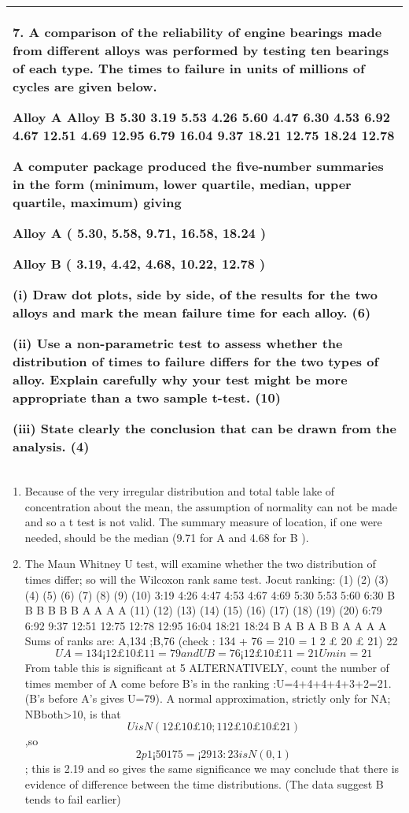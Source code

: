 \documentclass[a4paper,12pt]{article}
\begin{document}
\begin{table}[ht!]
 \centering
 \begin{tabular}{|p{15cm}|}
 \hline  
7. A comparison of the reliability of engine bearings made from different alloys was performed by testing ten bearings of each type.  The times to failure in units of millions of cycles are given below. 
 
Alloy A Alloy B   5.30   3.19   5.53   4.26   5.60   4.47   6.30   4.53   6.92   4.67 12.51   4.69 12.95   6.79 16.04   9.37 18.21 12.75 18.24 12.78 
 
A computer package produced the five-number summaries in the form (minimum, lower quartile, median, upper quartile, maximum) giving 
 
Alloy A   ( 5.30, 5.58, 9.71, 16.58, 18.24 ) 
 
Alloy B   ( 3.19, 4.42, 4.68, 10.22, 12.78 ) 
 
 
(i) Draw dot plots, side by side, of the results for the two alloys and mark the mean failure time for each alloy.  (6) 
 
(ii) Use a non-parametric test to assess whether the distribution of times to failure differs for the two types of alloy.  Explain carefully why your test might be more appropriate than a two sample t-test.  (10) 
 
(iii) State clearly the conclusion that can be drawn from the analysis. 
(4) \\ \hline
  \end{tabular}
\end{table}
\begin{enumerate}
\item 
Because of the very irregular distribution and total table lake of concentration
about the mean, the assumption of normality can not be made and so a t test is not
valid. The summary measure of location, if one were needed, should be the median
(9.71 for A and 4.68 for B ). 
\item The Maun Whitney U test, will examine whether the two
distribution of times differ; so will the Wilcoxon rank same test.
Jocut ranking:
(1) (2) (3) (4) (5) (6) (7) (8) (9) (10)
3:19 4:26 4:47 4:53 4:67 4:69 5:30 5:53 5:60 6:30
B B B B B B A A A A
(11) (12) (13) (14) (15) (16) (17) (18) (19) (20)
6:79 6:92 9:37 12:51 12:75 12:78 12:95 16:04 18:21 18:24
B A B A B B A A A A
Sums of ranks are: A,134 ;B,76 (check : 134 + 76 = 210 = 1
2 £ 20 £ 21)
22
\[UA = 134 ¡
1
2
£ 10 £ 11 = 79 and UB = 76 ¡
1
2
£ 10 £ 11 = 21 Umin = 21\]
From table this is significant at 5%
ALTERNATIVELY, count the number of times member of A come before B’s in the
ranking :U=4+4+4+4+3+2=21.(B’s before A’s gives U=79). A normal approximation,
strictly only for NA; NBboth>10, is that \[U is N( 1
2 £ 10 £ 10; 1
12 £ 10 £ 10 £ 21)\],so
\[2p1¡50
175 = ¡ 29
13:23 is N(0,1)\]; this is 2.19 and so gives the same significance
we may conclude that there is evidence of difference between the time distributions.
(The data suggest B tends to fail earlier)
\end{enumerate}
\end{document}
